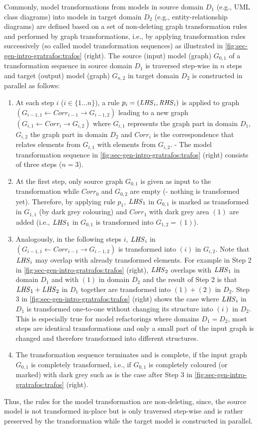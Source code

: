 Commonly, model transformations from models in source domain $D_1$ (e.g., UML class diagrams) into models in target domain $D_2$ (e.g., entity-relationship diagrams) are defined based on a set of non-deleting graph transformation rules and performed by graph transformations, i.e., by applying transformation rules successively (so called model transformation sequences) as illustrated in \cref{fig:sec-gen-intro-gratrafos:trafos} (right).
The source (input) model (graph) $G_{0,1}$ of a transformation sequence in source domain $D_1$ is traversed step-wise in $n$ steps and target (output) model (graph) $G_{n,2}$ in target domain $D_2$ is constructed in parallel as follows:
\begin{enumerate}
\item At each step $i$ ($i \in \{1\ldots n\}$), a rule $p_i=(\mathit{LHS}_i,\mathit{RHS}_i)$ is applied to graph $(G_{i-1,1} \gets Corr_{i-1} \to G_{i-1,2})$ leading to a new graph $(G_{i,1} \gets Corr_{i} \to G_{i,2})$ where $G_{i,1}$ represents the graph part in domain $D_1$, $G_{i,2}$ the graph part in domain $D_2$ and $Corr_i$ is the correspondence that relates elements from $G_{i,1}$ with elements from $G_{i,2}$. - The model transformation sequence in \cref{fig:sec-gen-intro-gratrafos:trafos} (right) consists of three steps ($n=3$).
\item At the first step, only source graph $G_{0,1}$ is given as input to the transformation while $Corr_0$ and $G_{0,2}$ are empty (- nothing is transformed yet).
Therefore, by applying rule $p_1$, $\mathit{LHS}_1$ in $G_{0,1}$ is marked as transformed in $G_{1,1}$ (by dark grey colouring) and $Corr_1$ with dark grey area $(1)$ are added (i.e., $\mathit{LHS}_1$ in $G_{0,1}$ is transformed into $G_{1,2}=(1)$).
\item Analogously, in the following steps $i$, $\mathit{LHS}_i$ in $(G_{i-1,1} \gets Corr_{i-1} \to G_{i-1,2})$ is transformed into $(i)$ in $G_{i,2}$.
Note that $\mathit{LHS}_i$ may overlap with already transformed elements.
For example in Step 2 in \cref{fig:sec-gen-intro-gratrafos:trafos} (right), $\mathit{LHS}_2$ overlaps with $\mathit{LHS}_1$ in domain $D_1$ and with $(1)$ in domain $D_2$ and the result of Step 2 is that $\mathit{LHS}_1 + \mathit{LHS}_2$ in $D_1$ together are transformed into $(1)+(2)$ in $D_2$.
Step 3 in \cref{fig:sec-gen-intro-gratrafos:trafos} (right) shows the case where $\mathit{LHS}_i$ in $D_1$ is transformed one-to-one without changing its structure into $(i)$ in $D_2$.
This is especially true for model refactorings where domains $D_1=D_2$, most steps are identical transformations and only a small part of the input graph is changed and therefore transformed into different structures.
\item The transformation sequence terminates and is complete, if the input graph $G_{0,1}$ is completely transformed, i.e., if $G_{0,1}$ is completely coloured (or marked) with dark grey such as is the case after Step 3 in \cref{fig:sec-gen-intro-gratrafos:trafos} (right).
\end{enumerate}
Thus, the rules for the model transformation are non-deleting, since, the source model is not transformed in-place but is only traversed step-wise and is rather preserved by the transformation while the target model is constructed in parallel.

